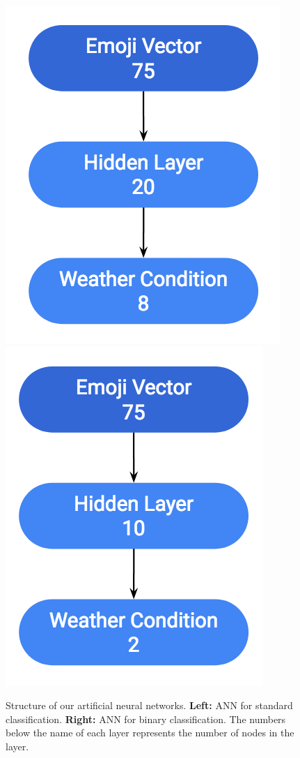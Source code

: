 \documentclass[12pt]{article}
\begin{document}
\begin{figure}[H]
\includegraphics[scale=0.7]{neuralnet}
\includegraphics[scale=0.7]{neuralnetbinary}
\centering
\caption{Structure of our artificial neural networks. \textbf{Left:} ANN for standard classification. \textbf{Right:} ANN for binary classification. The numbers below the name of each layer represents the number of nodes in the layer.}
\label{fig:neuralnet}
\end{figure}
\end{document}

